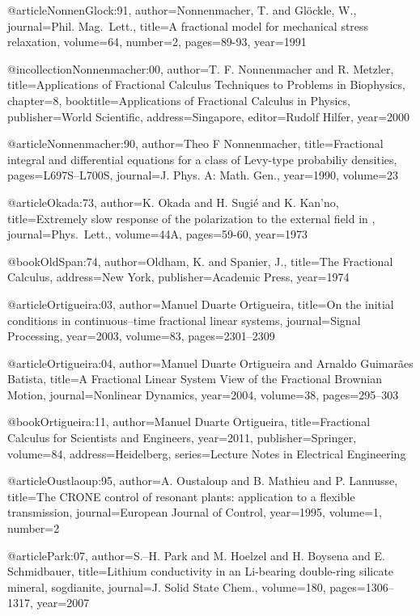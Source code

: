 \begin{thebibliography}{99}
@article{NonnenGlock:91,
  author={Nonnenmacher, T. and Gl{\"{o}}ckle, W.},
  journal={Phil. Mag.\ Lett.},
  title={A fractional model for mechanical stress relaxation},
  volume={64},
  number={2},
  pages={89-93},
  year={1991}
}

@incollection{Nonnenmacher:00,
  author={T. F. Nonnenmacher and R. Metzler},
  title={Applications of Fractional Calculus Techniques to Problems in Biophysics},
  chapter={8},
  booktitle={Applications of Fractional Calculus in Physics},
  publisher={World Scientific},
  address={Singapore},
  editor={Rudolf Hilfer},
  year={2000}
}

@article{Nonnenmacher:90,
  author={Theo F Nonnenmacher},
  title={Fractional integral and differential equations for a class of {L}evy-type
    probabiliy densities},
  pages={L697S--L700S},
  journal={J. Phys. A: Math. Gen.},
  year={1990},
  volume={23}
}

@article{Okada:73,
  author={K. Okada and H. Sugi\'e and K. Kan'no},
  title={Extremely slow response of the polarization to the external field in },
  journal={Phys.\ Lett.},
  volume={44A},
  pages={59-60},
  year={1973}
}

@book{OldSpan:74,
  author={Oldham, K. and Spanier, J.},
  title={The Fractional Calculus},
  address={New York},
  publisher={Academic Press},
  year={1974}
}

@article{Ortigueira:03,
  author={Manuel Duarte Ortigueira},
  title={On the initial conditions in continuous--time fractional linear systems},
  journal={Signal Processing},
  year={2003},
  volume={83},
  pages={2301--2309}
}

@article{Ortigueira:04,
  author={Manuel Duarte Ortigueira and Arnaldo Guimar{\~a}es Batista},
  title={A Fractional Linear System View of the Fractional {B}rownian Motion},
  journal={Nonlinear Dynamics},
  year={2004},
  volume={38},
  pages={295--303}
}

@book{Ortigueira:11,
  author={Manuel Duarte Ortigueira},
  title={Fractional Calculus for Scientists and Engineers},
  year={2011},
  publisher={Springer},
  volume={84},
  address={Heidelberg},
  series={Lecture Notes in Electrical Engineering}
}

@article{Oustlaoup:95,
  author={A. Oustaloup and B. Mathieu and P. Lannusse},
  title={The {CRONE} control of resonant plants: application to a flexible transmission},
  journal={European Journal of Control},
  year={1995},
  volume={1},
  number={2}
}

@article{Park:07,
  author={S.--H. Park and M. Hoelzel and H. Boysena and E. Schmidbauer},
  title={Lithium conductivity in an Li-bearing double-ring silicate mineral, sogdianite},
  journal={J. Solid State Chem.},
  volume={180},
  pages={1306--1317},
  year={2007}
}


\end{thebibliography}
